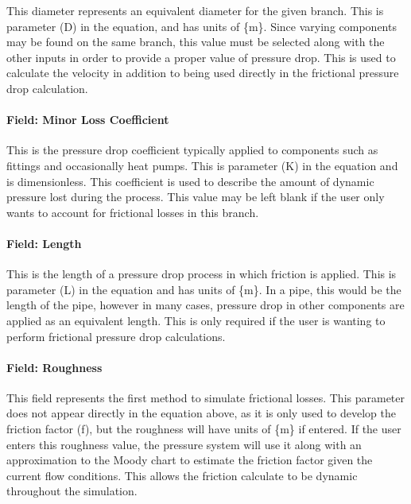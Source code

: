 This diameter represents an equivalent diameter for the given branch. This is parameter (D) in the equation, and has units of \{m\}. Since varying components may be found on the same branch, this value must be selected along with the other inputs in order to provide a proper value of pressure drop. This is used to calculate the velocity in addition to being used directly in the frictional pressure drop calculation.

\paragraph{Field: Minor Loss Coefficient}\label{field-minor-loss-coefficient}

This is the pressure drop coefficient typically applied to components such as fittings and occasionally heat pumps. This is parameter (K) in the equation and is dimensionless. This coefficient is used to describe the amount of dynamic pressure lost during the process. This value may be left blank if the user only wants to account for frictional losses in this branch.

\paragraph{Field: Length}\label{field-length}

This is the length of a pressure drop process in which friction is applied. This is parameter (L) in the equation and has units of \{m\}. In a pipe, this would be the length of the pipe, however in many cases, pressure drop in other components are applied as an equivalent length. This is only required if the user is wanting to perform frictional pressure drop calculations.

\paragraph{Field: Roughness}\label{field-roughness}

This field represents the first method to simulate frictional losses. This parameter does not appear directly in the equation above, as it is only used to develop the friction factor (f), but the roughness will have units of \{m\} if entered. If the user enters this roughness value, the pressure system will use it along with an approximation to the Moody chart to estimate the friction factor given the current flow conditions. This allows the friction calculate to be dynamic throughout the simulation.

